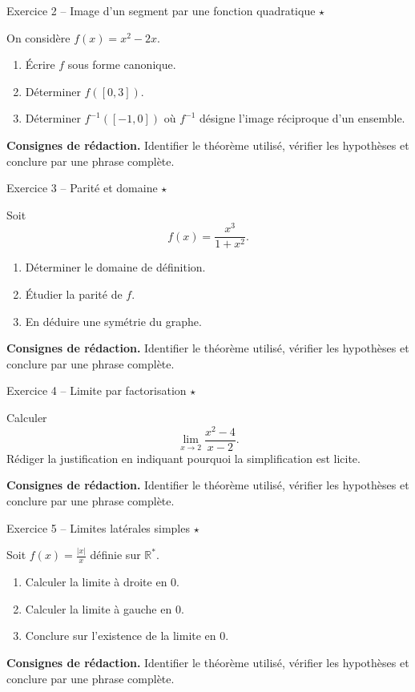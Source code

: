 \documentclass[11pt,a4paper]{article}
\newcommand{\etoiles}[1]{\hfill\textcolor{orangeprepa}{\textbf{#1}}}
\newcommand{\R}{\mathbb{R}}
\begin{document}
\begin{exobox}{Exercice 2 -- Image d'un segment par une fonction quadratique \etoiles{$\star$}}

On considère $f(x)=x^2-2x$.
\begin{enumerate}
\item Écrire $f$ sous forme canonique.
\item Déterminer $f([0,3])$.
\item Déterminer $f^{-1}([-1,0])$ où $f^{-1}$ désigne l'image réciproque d'un ensemble.
\end{enumerate}

\medskip
\textbf{Consignes de rédaction.} Identifier le théorème utilisé, vérifier les hypothèses et conclure par une phrase complète.
\end{exobox}


\begin{exobox}{Exercice 3 -- Parité et domaine \etoiles{$\star$}}

Soit
\[
f(x)=\frac{x^3}{1+x^2}.
\]
\begin{enumerate}
\item Déterminer le domaine de définition.
\item Étudier la parité de $f$.
\item En déduire une symétrie du graphe.
\end{enumerate}

\medskip
\textbf{Consignes de rédaction.} Identifier le théorème utilisé, vérifier les hypothèses et conclure par une phrase complète.
\end{exobox}


\begin{exobox}{Exercice 4 -- Limite par factorisation \etoiles{$\star$}}

Calculer
\[
\lim_{x\to2}\frac{x^2-4}{x-2}.
\]
Rédiger la justification en indiquant pourquoi la simplification est licite.

\medskip
\textbf{Consignes de rédaction.} Identifier le théorème utilisé, vérifier les hypothèses et conclure par une phrase complète.
\end{exobox}


\begin{exobox}{Exercice 5 -- Limites latérales simples \etoiles{$\star$}}

Soit $f(x)=\frac{|x|}{x}$ définie sur $\R^*$.
\begin{enumerate}
\item Calculer la limite à droite en $0$.
\item Calculer la limite à gauche en $0$.
\item Conclure sur l'existence de la limite en $0$.
\end{enumerate}

\medskip
\textbf{Consignes de rédaction.} Identifier le théorème utilisé, vérifier les hypothèses et conclure par une phrase complète.
\end{exobox}
\end{document}
